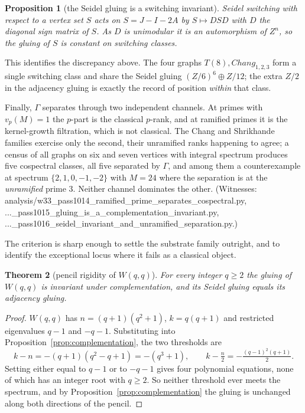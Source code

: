 \documentclass[12pt,a4paper]{article}
\def\mathbb#1{#1}%
\def\mathrm#1{#1}%
\def\mathcal#1{#1}%
\def\texttt#1{#1}%
\newtheorem{theorem}{Theorem}[section]
\newtheorem{proposition}[theorem]{Proposition}
\theoremstyle{definition}
\newcommand{\ZZ}{\mathbb{Z}}
\begin{document}
\begin{proposition}[the Seidel gluing is a switching invariant]
\label{prop:seidel-switching}
Seidel switching with respect to a vertex set $S$ acts on $\mathcal S = J-I-2A$
by $\mathcal S \mapsto D\mathcal S D$ with $D$ the diagonal sign matrix of $S$.
As $D$ is unimodular it is an automorphism of $\ZZ^n$, so the gluing of
$\mathcal S$ is constant on switching classes.
\end{proposition}

This identifies the discrepancy above. The four graphs $T(8),\mathrm{Chang}_{1,2,3}$
form a single switching class and share the Seidel gluing
$(\ZZ/6)^6\oplus\ZZ/12$; the extra $\ZZ/2$ in the adjacency gluing is exactly the
record of position \emph{within} that class.

Finally, $\Gamma$ separates through two independent channels. At primes with
$v_p(M) = 1$ the $p$-part is the classical $p$-rank, and at ramified primes it is
the kernel-growth filtration, which is not classical. The Chang and Shrikhande
families exercise only the second, their unramified ranks happening to agree; a
census of all graphs on six and seven vertices with integral spectrum produces
five cospectral classes, all five separated by $\Gamma$, and among them a
counterexample at spectrum $\{2,1,0,-1,-2\}$ with $M = 24$ where the separation
is at the \emph{unramified} prime $3$. Neither channel dominates the other.
(Witnesses:
\texttt{analysis/w33\_pass1014\_ramified\_prime\_separates\_cospectral.py},
\texttt{...\_pass1015\_gluing\_is\_a\_complementation\_invariant.py},
\texttt{...\_pass1016\_seidel\_invariant\_and\_unramified\_separation.py}.)

The criterion is sharp enough to settle the substrate family outright, and to
identify the exceptional locus where it fails as a classical object.

\begin{theorem}[pencil rigidity of $W(q,q)$]
\label{thm:wqq-pencil-rigid}
For every integer $q\ge 2$ the gluing of $W(q,q)$ is invariant under
complementation, and its Seidel gluing equals its adjacency gluing.
\end{theorem}

\begin{proof}
$W(q,q)$ has $n=(q+1)(q^2+1)$, $k=q(q+1)$ and restricted eigenvalues $q-1$ and
$-q-1$. Substituting into Proposition~\ref{prop:complementation}, the two
thresholds are
\[
  k-n = -(q+1)(q^2-q+1) = -(q^3+1),
  \qquad
  k-\tfrac n2 = -\tfrac{(q-1)^2(q+1)}{2}.
\]
Setting either equal to $q-1$ or to $-q-1$ gives four polynomial equations, none
of which has an integer root with $q\ge2$. So neither threshold ever meets the
spectrum, and by Proposition~\ref{prop:complementation} the gluing is unchanged
along both directions of the pencil.
\end{proof}
\end{document}
